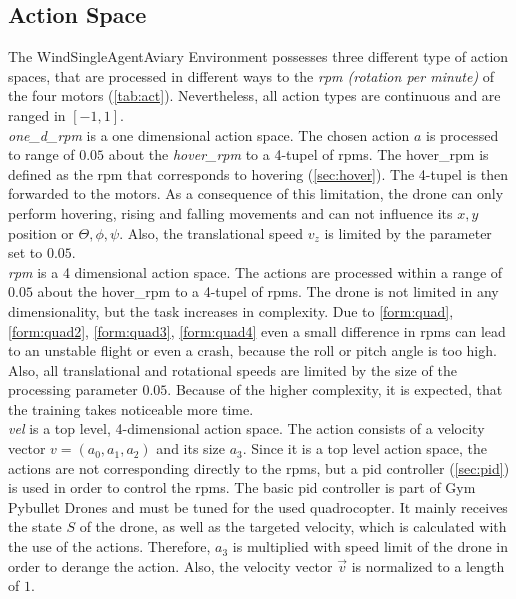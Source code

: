 \subsection{Action Space}
The WindSingleAgentAviary Environment possesses three different type of action spaces, 
that are processed in different ways to the \emph{rpm (rotation per minute)} of the four motors (\cref{tab:act}). 
Nevertheless, all action types are continuous and are ranged in $[-1, 1]$.\\
\newline
\emph{one\_d\_rpm} is a one dimensional action space. 
The chosen action $a$ is processed to range of $0.05$ about the \emph{hover\_rpm} to a 4-tupel of rpms. 
The hover\_rpm is defined as the rpm that corresponds to hovering (\cref{sec:hover}). 
The 4-tupel is then forwarded to the motors. 
As a consequence of this limitation, the drone can only perform hovering, 
rising and falling movements and can not influence its $x,y$ position or $\Theta, \phi, \psi$. 
Also, the translational speed $v_z$ is limited by the parameter set to $0.05$.\\
\newline
\emph{rpm} is a 4 dimensional action space. The actions are processed within a range of $0.05$ about the hover\_rpm to a 4-tupel of rpms. 
The drone is not limited in any dimensionality, but the task increases in complexity. 
Due to \cref{form:quad}, \cref{form:quad2}, \cref{form:quad3}, \cref{form:quad4} even a small difference in rpms can lead to an unstable flight
 or even a crash, because the roll or pitch angle is too high. 
 Also, all translational and rotational speeds are limited by the size of the processing parameter $0.05$. 
 Because of the higher complexity, it is expected, that the training takes noticeable more time.\\
\newline
\emph{vel} is a top level, 4-dimensional action space. The action consists of a velocity vector $v = (a_0, a_1, a_2)$ and its size $a_3$. 
Since it is a top level action space, the actions are not corresponding directly to the rpms, but a pid controller (\cref{sec:pid}) is used in order to control the rpms. 
The basic pid controller is part of Gym Pybullet Drones \cite{panerati2021learning} and must be tuned for the used quadrocopter. 
It mainly receives the state $S$ of the drone, as well as the targeted velocity, which is calculated with the use of the actions. 
Therefore, $a_3$ is multiplied with speed limit of the drone in order to derange the action. 
Also, the velocity vector $\overrightarrow{v}$ is normalized to a length of $1$.\\
